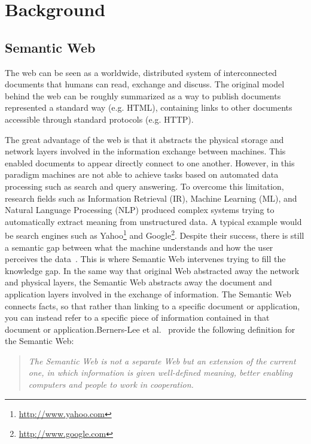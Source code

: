 \chapter{Background} \label{ch:background}
\graphicspath{{Background/figures/}}

\section{Semantic Web} \label{sec:sematic-web}

The web can be seen as a worldwide, distributed system of interconnected documents that humans can read, exchange and discuss. The original model behind the web can be roughly summarized as a way to publish documents represented a standard way (e.g. HTML), containing links to other documents accessible through standard protocols (e.g. HTTP).

The great advantage of the web is that it abstracts the physical storage and network layers involved in the information exchange between machines. This enabled documents to appear directly connect to one another. However, in this paradigm machines are not able to achieve tasks based on automated data processing such as search and query answering. To overcome this limitation, research fields such as Information Retrieval (IR), Machine Learning (ML), and Natural Language Processing (NLP) produced complex systems trying to automatically extract meaning from unstructured data. A typical example would be search engines such as Yahoo\footnote{\url{http://www.yahoo.com}} and Google\footnote{\url{http://www.google.com}}. Despite their success, there is still a semantic gap between what the machine understands and how the user perceives the data~\cite{Mika:book:07}. This is where Semantic Web intervenes trying to fill the knowledge gap. In the same way that original Web abstracted away the network and physical layers, the Semantic Web abstracts away the document and application layers involved in the exchange of information. The Semantic Web connects facts, so that rather than linking to a specific document or application, you can instead refer to a specific piece of information contained in that document or application.Berners-Lee et al.~\cite{BernersLee:ScientificAmerican:01} provide the following definition for the Semantic Web:

\begin{quote}
	\emph{The Semantic Web is not a separate Web but an extension of the current one, in which information is given well-defined meaning, better enabling computers and people to work in cooperation.}
\end{quote}


